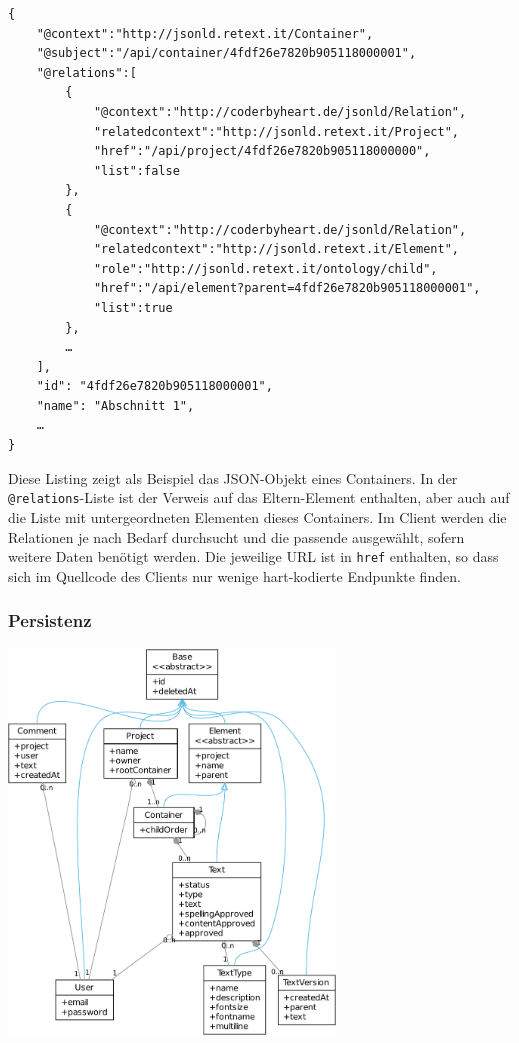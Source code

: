 \begin{samepage}
\begin{verbatim}
{
    "@context":"http://jsonld.retext.it/Container",
    "@subject":"/api/container/4fdf26e7820b905118000001",
    "@relations":[
        {
            "@context":"http://coderbyheart.de/jsonld/Relation",
            "relatedcontext":"http://jsonld.retext.it/Project",
            "href":"/api/project/4fdf26e7820b905118000000",
            "list":false
        },
        {
            "@context":"http://coderbyheart.de/jsonld/Relation",
            "relatedcontext":"http://jsonld.retext.it/Element",
            "role":"http://jsonld.retext.it/ontology/child",
            "href":"/api/element?parent=4fdf26e7820b905118000001",
            "list":true
        },
        …
    ],
    "id": "4fdf26e7820b905118000001",
    "name": "Abschnitt 1",
    …
}
\end{verbatim}

Diese Listing zeigt als Beispiel das JSON-Objekt eines Containers. In der \texttt{@relations}-Liste ist der Verweis auf das Eltern-Element enthalten, aber auch auf die Liste mit untergeordneten Elementen dieses Containers. Im Client werden die Relationen je nach Bedarf durchsucht und die passende ausgewählt, sofern weitere Daten benötigt werden. Die jeweilige URL ist in \texttt{href} enthalten, so dass sich im Quellcode des Clients nur wenige hart-kodierte Endpunkte finden.
\end{samepage}

\subsubsection{Persistenz}

\begin{center}
\includegraphics[width=0.65\textwidth]{media/prototyp-persistenz.pdf}
\end{center}
\label{chart:prototype-persistenz}


